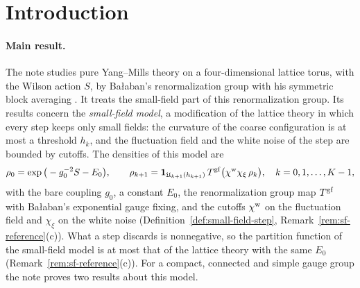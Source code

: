 \section{Introduction}\label{sec:intro}

\paragraph{Main result.} The note studies pure Yang--Mills theory on a four-dimensional lattice torus, with the Wilson action $S$, by Ba\l aban's renormalization group with his symmetric block averaging \cite{BalYM4I,BalYM4II}. It treats the small-field part of this renormalization group. Its results concern the \emph{small-field model}, a modification of the lattice theory in which every step keeps only small fields: the curvature of the coarse configuration is at most a threshold $h_k$, and the fluctuation field and the white noise of the step are bounded by cutoffs. The densities of this model are
\[
\rho_0=\exp\big(-g_0^{-2}S-E_0\big),\qquad\rho_{k+1}=\mathbf 1_{\mathfrak U_{k+1}(h_{k+1})}\,T^{\rm gf}\big(\chi^{\rm w}\chi_\xi\,\rho_k\big),\quad k=0,1,\dots,K-1,
\]
with the bare coupling $g_0$, a constant $E_0$, the renormalization group map $T^{\rm gf}$ with Ba\l aban's exponential gauge fixing, and the cutoffs $\chi^{\rm w}$ on the fluctuation field and $\chi_\xi$ on the white noise (Definition~\ref{def:small-field-step}, Remark~\ref{rem:sf-reference}(c)). What a step discards is nonnegative, so the partition function of the small-field model is at most that of the lattice theory with the same $E_0$ (Remark~\ref{rem:sf-reference}(c)). For a compact, connected and simple gauge group the note proves two results about this model.
